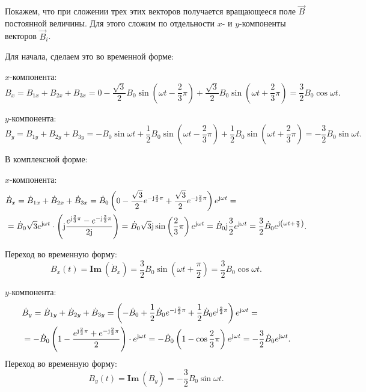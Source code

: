 	Покажем, что при сложении трех этих векторов получается вращающееся поле
    \( \vec{B} \) постоянной величины. Для этого сложим по отдельности \( x \)-
    и \( y \)-компоненты векторов \( \vec{B}_{i} \).
	
	Для начала, сделаем это во временной форме:
	
	\( x \)-компонента:
    \[
        B_{x} = B_{1x} + B_{2x} + B_{3x} = 0 -
        \frac{\sqrt{3}}{2}B_0\sin\left(\omega t - \frac{2}{3}\pi\right) +
        \frac{\sqrt{3}}{2}B_0\sin\left(\omega t + \frac{2}{3}\pi\right) =
        \frac{3}{2}B_0\cos\omega t.
	\]

	\( y \)-компонента:
	\[
        B_{y} = B_{1y} + B_{2y} + B_{3y} = -B_0\sin\omega t +
        \frac{1}{2}B_0\sin\left(\omega t - \frac{2}{3}\pi\right) +
        \frac{1}{2}B_0\sin\left(\omega t + \frac{2}{3}\pi\right) =
        -\frac{3}{2}B_0\sin\omega t.
	\]
	
	В комплексной форме:
	
	\( x \)-компонента:
	\begin{align*}
	    & \dot{B}_{x} = \dot{B}_{1x} + \dot{B}_{2x} + \dot{B}_{3x} =
        \dot{B}_0\left( 0 - \frac{\sqrt{3}}{2} e^{-\mathrm{j}\frac{2}{3}\pi} +
        \frac{\sqrt{3}}{2} e^{-\mathrm{j}\frac{2}{3}\pi} \right)e^{\mathrm{j}\omega t} =
        \\
        & = \dot{B}_0\sqrt{3}e^{\mathrm{j}\omega t}\cdot\left(\mathrm{j}
        \frac{e^{\mathrm{j}\frac{2}{3}\pi} - e^{-\mathrm{j}\frac{2}{3}\pi}}{2\mathrm{j}}
        \right) = 
        \dot{B}_0\sqrt{3}\mathrm{j}\sin\left(\frac{2}{3}\pi\right)e^{\mathrm{j}\omega t}
        = \dot{B}_0\mathrm{j}\frac{3}{2}e^{\mathrm{j}\omega t} = 
        \frac{3}{2}\dot{B}_0e^{\mathrm{j}\left(\omega t + \frac{\pi}{2}\right)}.
	\end{align*}
	
    Переход во временную форму:
	\[
        B_{x}(t) = \mathbf{Im\ }(\dot{B}_{x}) =
        \frac{3}{2}B_0\sin\left(\omega t + \frac{\pi}{2}\right) =
        \frac{3}{2}B_0\cos\omega t. 
    \]
	
	\( y \)-компонента:
	\begin{align*}
        & \dot{B}_{y} = \dot{B}_{1y} + \dot{B}_{2y} + \dot{B}_{3y} =
        \left(-\dot{B}_0 + \frac{1}{2}\dot{B}_0e^{-\mathrm{j}\frac{2}{3}\pi} +
        \frac{1}{2}\dot{B}_0e^{\mathrm{j}\frac{2}{3}\pi}\right)e^{\mathrm{j}\omega t} =
        \\
        & = -\dot{B}_0\left(1 - \frac{e^{\mathrm{j}\frac{2}{3}\pi} +
        e^{-\mathrm{j}\frac{2}{3}\pi}}{2}\right)\cdot e^{\mathrm{j}\omega t} =
        -\dot{B}_0\left(1-\cos\frac{2}{3}\pi\right)e^{\mathrm{j}\omega t} =
        -\frac{3}{2}\dot{B}_0e^{\mathrm{j}\omega t}.
	\end{align*}
	Переход во временную форму:
	\[
        B_{y}(t) = \mathbf{Im\ }(\dot{B}_{y}) = -\frac{3}{2}B_0\sin\omega t.
    \]
	
